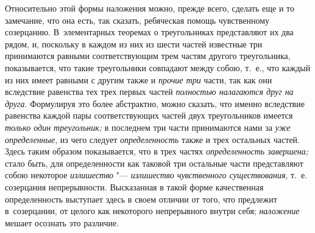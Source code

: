 Относительно этой формы наложения можно, прежде всего, сделать еще и то
замечание, что она есть, так сказать, ребяческая помощь чувственному
созерцанию. В~элементарных теоремах о треугольниках представляют их два рядом,
и, поскольку в каждом из них из шести частей известные три принимаются равными
соответствующим трем частям другого треугольника, показывается, что такие
треугольники совпадают между собою, т.~е., что каждый из них имеет равными с
другим также и {\em прочие три} части, так как они вследствие равенства тех
трех первых частей {\em полностью налагаются друг на друга}. Формулируя это
более абстрактно, можно сказать, что именно вследствие равенства каждой пары
соответствующих частей двух треугольников имеется {\em только один
треугольник;} в последнем три части принимаются нами за {\em уже определенные},
из чего следует {\em определенность} также и трех остальных частей. Здесь таким
образом показывается, что в трех частях {\em определенность завершена;} стало
быть, для определенности как таковой три остальные части представляют собою
некоторое {\em излишество} "--- {\em излишество чувственного существования},
т.~е. созерцания непрерывности. Высказанная в такой форме качественная
определенность выступает здесь в своем отличии от того, что предлежит
в~созерцании, от целого как некоторого непрерывного внутри себя;
{\em наложение} мешает осознать это различие.

